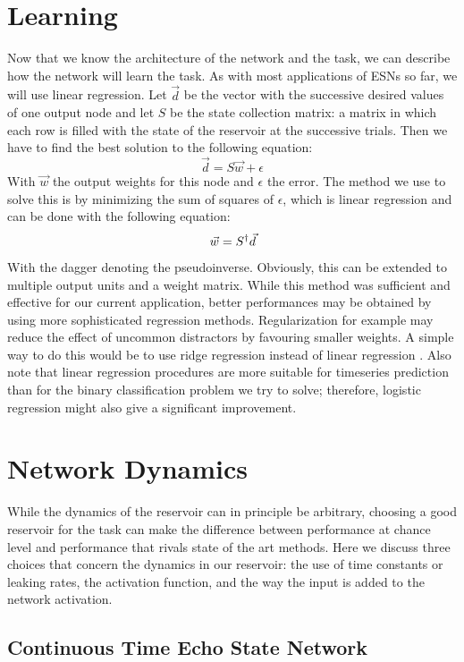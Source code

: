 \documentclass[10pt,a4paper]{report}
\begin{document}
\section{Learning}

Now that we know the architecture of the network and the task, we can describe how the network will learn the task. As with most applications of ESNs so far, we will use linear regression. Let $\vec{d}$ be the vector with the successive desired values of one output node and let $S$ be the state collection matrix: a matrix in which each row is filled with the state of the reservoir at the successive trials. Then we have to find the best solution to the following equation:
\[  \vec{d} = S \vec{w} + \epsilon \]
With $\vec{w}$ the output weights for this node and $\epsilon$ the error. The method we use to solve this is by minimizing the sum of squares of $\epsilon$, which is linear regression and can be done with the following equation:
\[ \vec{w} =  S \sp{\dagger} \vec{d} \]
With the dagger denoting the pseudoinverse. Obviously, this can be extended to multiple output units and a weight matrix. While this method was sufficient and effective for our current application, better performances may be obtained by using more sophisticated regression methods. Regularization for example may reduce the effect of uncommon distractors by favouring smaller weights. A simple way to do this would be to use ridge regression instead of linear regression \citep{Jaeger2007b}. Also note that linear regression procedures are more suitable for timeseries prediction than for the binary classification problem we try to solve; therefore, logistic regression might also give a significant improvement.

\section{Network Dynamics}

While the dynamics of the reservoir can in principle be arbitrary, choosing a good reservoir for the task can make the difference between performance at chance level and performance that rivals state of the art methods. Here we discuss three choices that concern the dynamics in our reservoir: the use of time constants or leaking rates, the activation function, and the way the input is added to the network activation.

\subsection*{Continuous Time Echo State Network}
\end{document}
